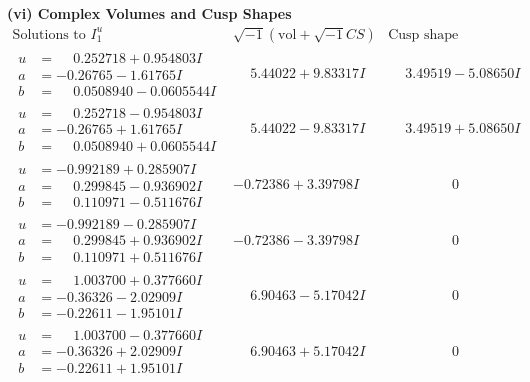 \documentclass[1p]{elsarticle_modified}
\theoremstyle{definition}
\newcommand{\I}{\sqrt{-1}}
\begin{document}
\newpage\flushleft \textbf{(vi) Complex Volumes and Cusp Shapes}
$$\begin{array}{c|c|c}  
\text{Solutions to }I^u_{1}& \I (\text{vol} + \sqrt{-1}CS) & \text{Cusp shape}\\
 \hline 
\begin{aligned}
u &= \phantom{-}0.252718 + 0.954803 I \\
a &= -0.26765 - 1.61765 I \\
b &= \phantom{-}0.0508940 - 0.0605544 I\end{aligned}
 & \phantom{-}5.44022 + 9.83317 I & \phantom{-}3.49519 - 5.08650 I \\ \hline\begin{aligned}
u &= \phantom{-}0.252718 - 0.954803 I \\
a &= -0.26765 + 1.61765 I \\
b &= \phantom{-}0.0508940 + 0.0605544 I\end{aligned}
 & \phantom{-}5.44022 - 9.83317 I & \phantom{-}3.49519 + 5.08650 I \\ \hline\begin{aligned}
u &= -0.992189 + 0.285907 I \\
a &= \phantom{-}0.299845 - 0.936902 I \\
b &= \phantom{-}0.110971 - 0.511676 I\end{aligned}
 & -0.72386 + 3.39798 I & \phantom{-0.000000 } 0 \\ \hline\begin{aligned}
u &= -0.992189 - 0.285907 I \\
a &= \phantom{-}0.299845 + 0.936902 I \\
b &= \phantom{-}0.110971 + 0.511676 I\end{aligned}
 & -0.72386 - 3.39798 I & \phantom{-0.000000 } 0 \\ \hline\begin{aligned}
u &= \phantom{-}1.003700 + 0.377660 I \\
a &= -0.36326 - 2.02909 I \\
b &= -0.22611 - 1.95101 I\end{aligned}
 & \phantom{-}6.90463 - 5.17042 I & \phantom{-0.000000 } 0 \\ \hline\begin{aligned}
u &= \phantom{-}1.003700 - 0.377660 I \\
a &= -0.36326 + 2.02909 I \\
b &= -0.22611 + 1.95101 I\end{aligned}
 & \phantom{-}6.90463 + 5.17042 I & \phantom{-0.000000 } 0 \\ \hline\begin{aligned}

\end{aligned}
\end{array}$$
\end{document}
